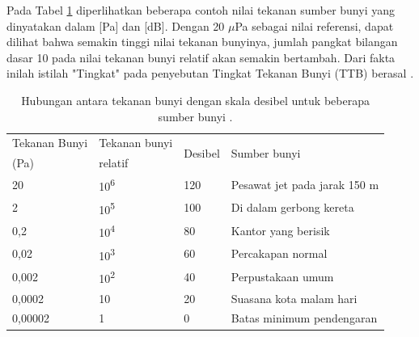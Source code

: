 Pada Tabel \ref{tab:hubungan-spl-desibel} diperlihatkan beberapa contoh nilai tekanan sumber bunyi yang dinyatakan dalam [Pa] dan [dB]. Dengan 20 $\mu$Pa sebagai nilai referensi, dapat dilihat bahwa semakin tinggi nilai tekanan bunyinya, jumlah pangkat bilangan dasar 10 pada nilai tekanan bunyi relatif akan semakin bertambah. Dari fakta inilah istilah "Tingkat" pada penyebutan Tingkat Tekanan Bunyi (TTB) berasal \cite{meyer}. \par 
\begin{table}[t!]
    \centering
    \caption{Hubungan antara tekanan bunyi dengan skala desibel untuk beberapa sumber bunyi \cite{ArtikelBukuSPL}.}
    \begin{tabular}{l l l l}
        \hline
        Tekanan Bunyi & Tekanan bunyi & \multirow{2}{4em}{Desibel} & \multirow{2}{8em}{Sumber bunyi} \\
        (Pa) & relatif & & \\
        \hline
        20 & 10\textsuperscript{6} & 120 & Pesawat jet pada jarak 150 m \\
        2 & 10\textsuperscript{5} & 100 & Di dalam gerbong kereta \\
        0,2 & 10\textsuperscript{4} & 80 & Kantor yang berisik \\
        0,02 & 10\textsuperscript{3} & 60 & Percakapan normal \\
        0,002 & 10\textsuperscript{2} & 40 & Perpustakaan umum \\
        0,0002 & 10 & 20 & Suasana kota malam hari \\
        0,00002 & 1 & 0 & Batas minimum pendengaran \\
        \hline
    \end{tabular}
    \label{tab:hubungan-spl-desibel}
\end{table}

